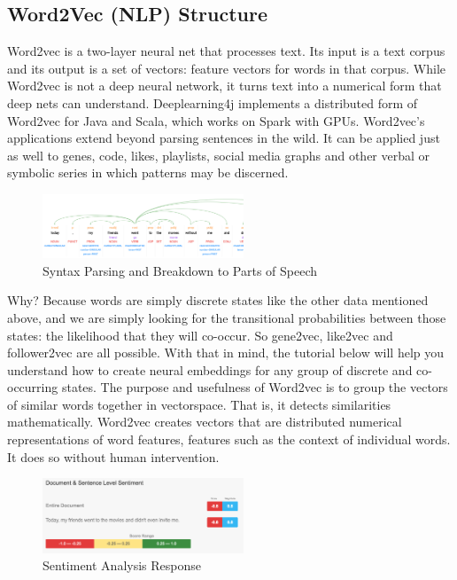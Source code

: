 \documentclass[conference,compsoc]{IEEEtran}
\begin{document}
\subsection{Word2Vec (NLP) Structure}

Word2vec is a two-layer neural net that processes text. Its input is a text corpus and its output is a set of vectors: feature vectors for words in that corpus. While Word2vec is not a deep neural network, it turns text into a numerical form that deep nets can understand. Deeplearning4j implements a distributed form of Word2vec for Java and Scala, which works on Spark with GPUs. Word2vec’s applications extend beyond parsing sentences in the wild. It can be applied just as well to genes, code, likes, playlists, social media graphs and other verbal or symbolic series in which patterns may be discerned.

\begin{figure}[H]
    \centering
    \includegraphics[width=6cm]{images/syntax-parsing.png}
    \caption{Syntax Parsing and Breakdown to Parts of Speech}
    \label{fig:syntax-parsing}
\end{figure}

Why? Because words are simply discrete states like the other data mentioned above, and we are simply looking for the transitional probabilities between those states: the likelihood that they will co-occur. So gene2vec, like2vec and follower2vec are all possible. With that in mind, the tutorial below will help you understand how to create neural embeddings for any group of discrete and co-occurring states. The purpose and usefulness of Word2vec is to group the vectors of similar words together in vectorspace. That is, it detects similarities mathematically. Word2vec creates vectors that are distributed numerical representations of word features, features such as the context of individual words. It does so without human intervention.

\begin{figure}[H]
    \centering
    \includegraphics[width=6cm]{images/sentiment-analysis.png}
    \caption{Sentiment Analysis Response}
    \label{fig:sentiment-analysis}
\end{figure}
\end{document}

